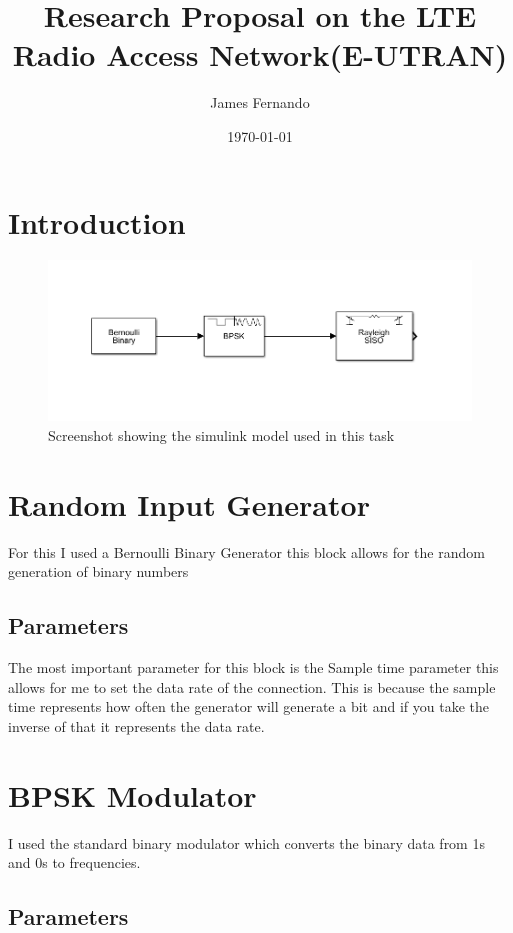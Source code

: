 \documentclass[a4paper,12pt]{scrartcl}
\title{Research Proposal on the LTE Radio Access Network(E-UTRAN)}
\author{James Fernando}
\date{\today}
\begin{document}
	
	\begin{titlepage}
		\maketitle
	\end{titlepage}
	
	\tableofcontents
	\newpage	
{
	\section{Introduction}{
		\begin{figure}
			\centering
			\includegraphics[width=\textwidth]{SimulinkModel}
			\caption{Screenshot showing the simulink model used in this task}
			\label{img:SimulinkModel}
		\end{figure}
	}
	\section{Random Input Generator}
	{
		For this I used a Bernoulli Binary Generator this block allows for the random generation of binary numbers
		\subsection{Parameters}
		{
			The most important parameter for this block is the Sample time parameter this allows for me to set the data rate of the connection. This is because the sample time represents how often the generator will generate a bit and if you take the inverse of that it represents the data rate.
		}
	}
	\section{BPSK Modulator}
	{
		I used the standard binary modulator which converts the binary data from 1s and 0s to frequencies.
		\subsection{Parameters}
	}
}
\end{document}
